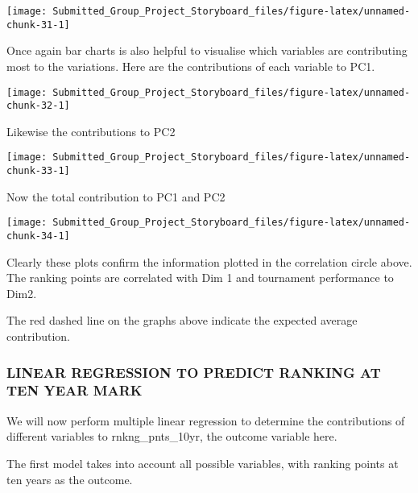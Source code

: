 \documentclass[]{article}
\begin{document}
\begin{center}\texttt{[image: Submitted\_Group\_Project\_Storyboard\_files/figure-latex/unnamed-chunk-31-1]} \end{center}

Once again bar charts is also helpful to visualise which variables are
contributing most to the variations. Here are the contributions of each
variable to PC1.

\begin{center}\texttt{[image: Submitted\_Group\_Project\_Storyboard\_files/figure-latex/unnamed-chunk-32-1]} \end{center}

Likewise the contributions to PC2

\begin{center}\texttt{[image: Submitted\_Group\_Project\_Storyboard\_files/figure-latex/unnamed-chunk-33-1]} \end{center}

Now the total contribution to PC1 and PC2

\begin{center}\texttt{[image: Submitted\_Group\_Project\_Storyboard\_files/figure-latex/unnamed-chunk-34-1]} \end{center}

Clearly these plots confirm the information plotted in the correlation
circle above. The ranking points are correlated with Dim 1 and
tournament performance to Dim2.

The red dashed line on the graphs above indicate the expected average
contribution.

\subsubsection{LINEAR REGRESSION TO PREDICT RANKING AT TEN YEAR
MARK}\label{linear-regression-to-predict-ranking-at-ten-year-mark}

We will now perform multiple linear regression to determine the
contributions of different variables to rnkng\_pnts\_10yr, the outcome
variable here.

The first model takes into account all possible variables, with ranking
points at ten years as the outcome.
\end{document}
